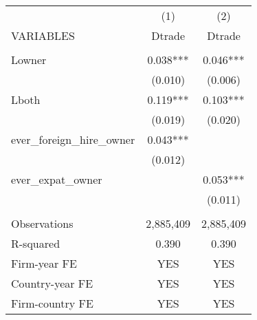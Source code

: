 \begin{tabular}{lcc} \hline
 & (1) & (2) \\
VARIABLES & Dtrade & Dtrade \\ \hline
 &  &  \\
Lowner & 0.038*** & 0.046*** \\
 & (0.010) & (0.006) \\
Lboth & 0.119*** & 0.103*** \\
 & (0.019) & (0.020) \\
ever\_foreign\_hire\_owner & 0.043*** &  \\
 & (0.012) &  \\
ever\_expat\_owner &  & 0.053*** \\
 &  & (0.011) \\
 &  &  \\
Observations & 2,885,409 & 2,885,409 \\
R-squared & 0.390 & 0.390 \\
Firm-year FE & YES & YES \\
Country-year FE & YES & YES \\
 Firm-country FE & YES & YES \\ \hline
\end{tabular}
